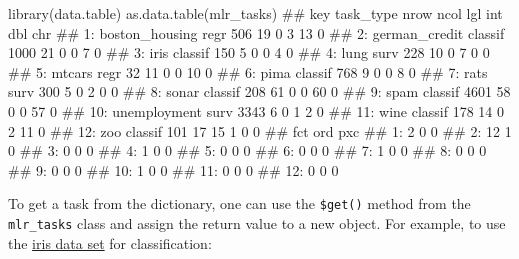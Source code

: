 \documentclass[
  11pt,
  parskip=half,
  DIV=calc,
  BCOR=10mm,
  x11names]{scrbook}
\newenvironment{Shaded}{}{}
\newcommand{\KeywordTok}[1]{\textcolor[rgb]{0.00,0.00,1.00}{#1}}
\newcommand{\NormalTok}[1]{#1}
\newcommand{\OperatorTok}[1]{#1}
\newcommand{\StringTok}[1]{\textcolor[rgb]{0.00,0.50,0.50}{#1}}
\begin{document}
\begin{Shaded}
\begin{Highlighting}[]
\KeywordTok{library}\NormalTok{(data.table)}
\KeywordTok{as.data.table}\NormalTok{(mlr_tasks)}
\NormalTok{##                key task_type nrow ncol lgl int dbl chr}
\NormalTok{##  1: boston_housing      regr  506   19   0   3  13   0}
\NormalTok{##  2:  german_credit   classif 1000   21   0   0   7   0}
\NormalTok{##  3:           iris   classif  150    5   0   0   4   0}
\NormalTok{##  4:           lung      surv  228   10   0   7   0   0}
\NormalTok{##  5:         mtcars      regr   32   11   0   0  10   0}
\NormalTok{##  6:           pima   classif  768    9   0   0   8   0}
\NormalTok{##  7:           rats      surv  300    5   0   2   0   0}
\NormalTok{##  8:          sonar   classif  208   61   0   0  60   0}
\NormalTok{##  9:           spam   classif 4601   58   0   0  57   0}
\NormalTok{## 10:   unemployment      surv 3343    6   0   1   2   0}
\NormalTok{## 11:           wine   classif  178   14   0   2  11   0}
\NormalTok{## 12:            zoo   classif  101   17  15   1   0   0}
\NormalTok{##     fct ord pxc}
\NormalTok{##  1:   2   0   0}
\NormalTok{##  2:  12   1   0}
\NormalTok{##  3:   0   0   0}
\NormalTok{##  4:   1   0   0}
\NormalTok{##  5:   0   0   0}
\NormalTok{##  6:   0   0   0}
\NormalTok{##  7:   1   0   0}
\NormalTok{##  8:   0   0   0}
\NormalTok{##  9:   0   0   0}
\NormalTok{## 10:   1   0   0}
\NormalTok{## 11:   0   0   0}
\NormalTok{## 12:   0   0   0}
\end{Highlighting}
\end{Shaded}

To get a task from the dictionary, one can use the \texttt{\$get()} method from the \texttt{mlr\_tasks} class and assign the return value to a new object.
For example, to use the \href{https://en.wikipedia.org/wiki/Iris_flower_data_set}{iris data set} for classification:

\begin{Shaded}
\end{Shaded}
\end{document}
